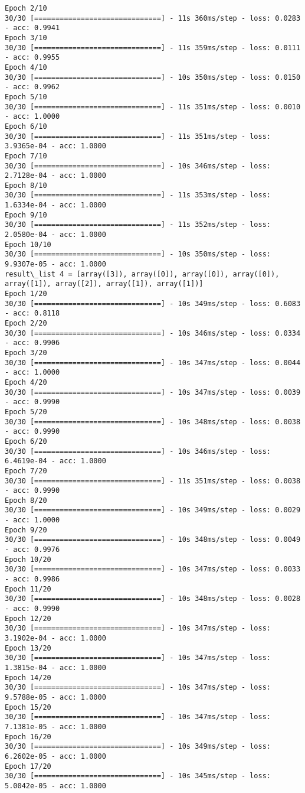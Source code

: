 \documentclass[11pt]{article}
\begin{document}
\begin{Verbatim}[commandchars=\\\{\}]
Epoch 2/10
30/30 [==============================] - 11s 360ms/step - loss: 0.0283 - acc: 0.9941
Epoch 3/10
30/30 [==============================] - 11s 359ms/step - loss: 0.0111 - acc: 0.9955
Epoch 4/10
30/30 [==============================] - 10s 350ms/step - loss: 0.0150 - acc: 0.9962
Epoch 5/10
30/30 [==============================] - 11s 351ms/step - loss: 0.0010 - acc: 1.0000
Epoch 6/10
30/30 [==============================] - 11s 351ms/step - loss: 3.9365e-04 - acc: 1.0000
Epoch 7/10
30/30 [==============================] - 10s 346ms/step - loss: 2.7128e-04 - acc: 1.0000
Epoch 8/10
30/30 [==============================] - 11s 353ms/step - loss: 1.6334e-04 - acc: 1.0000
Epoch 9/10
30/30 [==============================] - 11s 352ms/step - loss: 2.0580e-04 - acc: 1.0000
Epoch 10/10
30/30 [==============================] - 10s 350ms/step - loss: 9.9307e-05 - acc: 1.0000
result\_list 4 = [array([3]), array([0]), array([0]), array([0]), array([1]), array([2]), array([1]), array([1])]
Epoch 1/20
30/30 [==============================] - 10s 349ms/step - loss: 0.6083 - acc: 0.8118
Epoch 2/20
30/30 [==============================] - 10s 346ms/step - loss: 0.0334 - acc: 0.9906
Epoch 3/20
30/30 [==============================] - 10s 347ms/step - loss: 0.0044 - acc: 1.0000
Epoch 4/20
30/30 [==============================] - 10s 347ms/step - loss: 0.0039 - acc: 0.9990
Epoch 5/20
30/30 [==============================] - 10s 348ms/step - loss: 0.0038 - acc: 0.9990
Epoch 6/20
30/30 [==============================] - 10s 346ms/step - loss: 6.4619e-04 - acc: 1.0000
Epoch 7/20
30/30 [==============================] - 11s 351ms/step - loss: 0.0038 - acc: 0.9990
Epoch 8/20
30/30 [==============================] - 10s 349ms/step - loss: 0.0029 - acc: 1.0000
Epoch 9/20
30/30 [==============================] - 10s 348ms/step - loss: 0.0049 - acc: 0.9976
Epoch 10/20
30/30 [==============================] - 10s 347ms/step - loss: 0.0033 - acc: 0.9986
Epoch 11/20
30/30 [==============================] - 10s 348ms/step - loss: 0.0028 - acc: 0.9990
Epoch 12/20
30/30 [==============================] - 10s 347ms/step - loss: 3.1902e-04 - acc: 1.0000
Epoch 13/20
30/30 [==============================] - 10s 347ms/step - loss: 1.3815e-04 - acc: 1.0000
Epoch 14/20
30/30 [==============================] - 10s 347ms/step - loss: 9.5788e-05 - acc: 1.0000
Epoch 15/20
30/30 [==============================] - 10s 347ms/step - loss: 7.1381e-05 - acc: 1.0000
Epoch 16/20
30/30 [==============================] - 10s 349ms/step - loss: 6.2602e-05 - acc: 1.0000
Epoch 17/20
30/30 [==============================] - 10s 345ms/step - loss: 5.0042e-05 - acc: 1.0000

\end{Verbatim}
\end{document}

